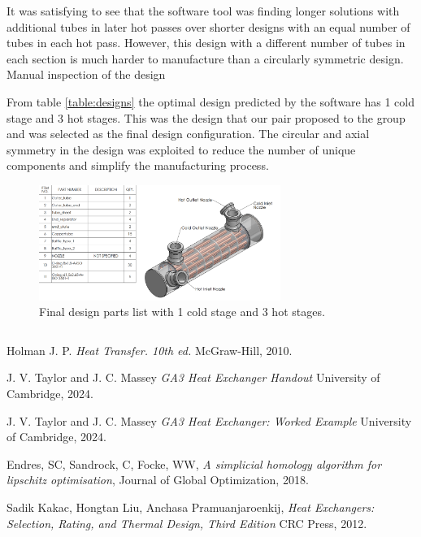 \documentclass{article}
\begin{document}
It was satisfying to see that the software tool was finding longer solutions with additional tubes in later hot passes over shorter designs with an equal number of tubes in each hot pass.
However, this design with a different number of tubes in each section is much harder to manufacture than a circularly symmetric design.
Manual inspection of the design 

From table \ref{table:designs} the optimal design predicted by the software has 1 cold stage and 3 hot stages.
This was the design that our pair proposed to the group and was selected as the final design configuration.
The circular and axial symmetry in the design was exploited to reduce the number of unique components and simplify the manufacturing process.


\begin{figure}
  \centering
  \includegraphics[width=0.7\textwidth]{final.png}
  \caption{Final design parts list with 1 cold stage and 3 hot stages.}
  \label{fig:final_design}
\end{figure}


\begin {lstlisting}[language=Python]

\end{lstlisting}



\begin{thebibliography}{9}

    Holman J. P.
    \emph{Heat Transfer. 10th ed.}
    McGraw-Hill,
    2010.


  J. V. Taylor and J. C. Massey
  \emph{GA3 Heat Exchanger Handout}
  University of Cambridge,
  2024.

  J. V. Taylor and J. C. Massey
  \emph{GA3 Heat Exchanger: Worked Example}
  University of Cambridge,
  2024.

  Endres, SC, Sandrock, C, Focke, WW,
  \emph{A simplicial homology algorithm for lipschitz optimisation},
  Journal of Global Optimization,
  2018.

  Sadik Kakac, Hongtan Liu, Anchasa Pramuanjaroenkij,
  \emph{Heat Exchangers: Selection, Rating, and Thermal Design, Third Edition}
  CRC Press,
  2012.

\end{thebibliography}
\end{document}
